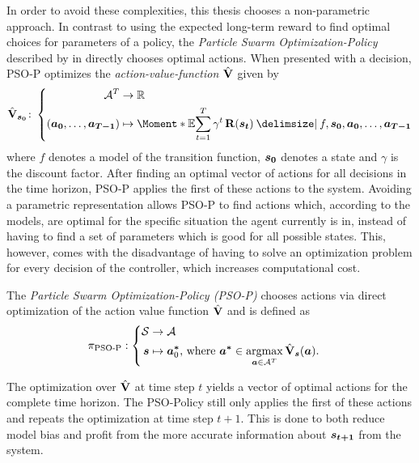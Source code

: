 In order to avoid these complexities, this thesis chooses a non-parametric approach.
In contrast to using the expected long-term reward to find optimal choices for parameters of a policy, the \emph{Particle Swarm Optimization-Policy} described by \citeauthor{hein_reinforcement_2016} in \cite{hein_reinforcement_2016} directly chooses optimal actions.
When presented with a decision, PSO-P optimizes the \emph{action-value-function $\operatorname{\hat{\operatorname{\mathbf{V}}}}$} given by
\begin{align}
    \label{eq:action_value_function}
    \AVlu_{\mat{s_0}} \colon \left\{
        \begin{aligned}
            \Ah^T &\to \R \\
            \left( \mat{a_0}, \dots, \mat{a_{T-1}} \right) &\mapsto \Moment*{\E}{\sum_{t=1}^T \gamma^t \Rwd(\mat{s_t}) \given f, \mat{s_0}, \mat{a_0}, \dots, \mat{a_{T-1}}}
        \end{aligned}
    \right.
\end{align}
where $f$ denotes a model of the transition function, $\bm{s_0}$ denotes a state and $\gamma$ is the discount factor.
After finding an optimal vector of actions for all decisions in the time horizon, PSO-P applies the first of these actions to the system.
Avoiding a parametric representation allows PSO-P to find actions which, according to the models, are optimal for the specific situation the agent currently is in, instead of having to find a set of parameters which is good for all possible states.
This, however, comes with the disadvantage of having to solve an optimization problem for every decision of the controller, which increases computational cost.
\begin{definition}[PSO-P]
    \label{def:psop}
    The \emph{Particle Swarm Optimization-Policy (PSO-P)} \cite{hein_reinforcement_2016} chooses actions via direct optimization of the action value function $\operatorname{\hat{\operatorname{\mathbf{V}}}}$ and is defined as
    \begin{align}
        \pi_{\text{PSO-P}} &: \left\{
            \begin{aligned}
                \Es &\to \Ah\\
                \mat{s} &\mapsto \mat{a^\ast}_0 \text{, where } \mat{a^\ast} \in \argmax_{\mat{a} \in \Ah^T} \AVlu_{\mat{s}}(\mat{a}).
            \end{aligned}
        \right.
    \end{align}
\end{definition}
The optimization over $\operatorname{\hat{\operatorname{\mathbf{V}}}}$ at time step $t$ yields a vector of optimal actions for the complete time horizon.
The PSO-Policy still only applies the first of these actions and repeats the optimization at time step $t+1$.
This is done to both reduce model bias and profit from the more accurate information about $\bm{s_{t+1}}$ from the system.

